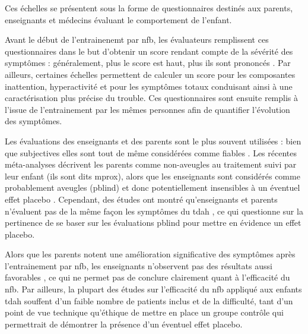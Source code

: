 Ces échelles se présentent sous la forme de questionnaires destinés aux parents, enseignants et médecins évaluant le comportement de l'enfant. 

Avant le début de l'entrainenemt par \gls{nfb}, les évaluateurs remplissent ces questionnaires dans le but d'obtenir un score rendant compte de 
la sévérité des symptômes : généralement, plus le score est haut, plus ils sont prononcés \citep{Pappas2006, Conners2008}. Par ailleurs, certaines échelles 
permettent de calculer un score pour les composantes inattention, hyperactivité et pour les symptômes totaux \citep{Pappas2006} conduisant ainsi à une caractérisation 
plus précise du trouble. Ces questionnaires sont ensuite remplis à l'issue de l'entrainement par les mêmes personnes afin de quantifier l'évolution 
des symptômes. 

Les évaluations des enseignants et des parents sont le plus souvent utilisées : bien que subjectives elles sont tout de même considérées comme fiables 
\citep{Mcgough2004}. Les récentes méta-analyses décrivent les parents comme non-aveugles au traitement suivi par leur enfant (ils sont dits \gls{mprox}), alors
que les enseignants sont considérés comme probablement aveugles (\gls{pblind}) et donc potentiellement insensibles à un éventuel effet placebo 
\citep{Micoulaud2014, Cortese2016}. Cependant, des études ont montré qu'enseignants et parents n'évaluent pas de la même façon les symptômes du \gls{tdah}
\citep{Sollie2013, Narad2015, Minder2018, Enriquez2019}, ce qui questionne sur la pertinence de se baser sur les évaluations \gls{pblind} pour mettre en évidence un 
effet placebo.

Alors que les parents notent une amélioration significative des symptômes après l'entrainement par \gls{nfb}, les enseignants n'observent pas des
résultats aussi favorables \citep{Arns2009, Sonuga-Barke2013, Cortese2016}, ce qui ne permet pas de conclure clairement quant à l'efficacité du \gls{nfb}.
Par ailleurs, la plupart des études sur l'efficacité du \gls{nfb} appliqué aux enfants \gls{tdah} souffent d'un faible nombre de patients inclus 
\citep{Baumeister2016, Heinrich2004} et de la difficulté, tant d'un point de vue technique qu'éthique \citep{LaVaque2001, Birbaumer1991, Holtmann2014} de mettre en place 
un groupe contrôle qui permettrait de démontrer la présence d'un éventuel effet placebo.

